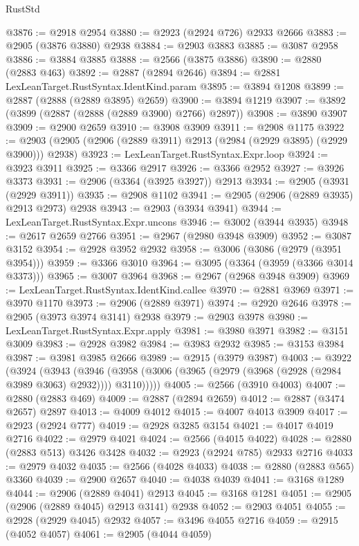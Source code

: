 \begin{lexlean}{RustStd}
\begin{coremodule}
{\begin{coremodule}
{{{{{{{{{{{{{{{{{{{{{{{{{{{{{{{{{{{{{{{{{{{{{{{{{{{{{{{{{{{{{{{{{{{{{{{{{{{{{{@3876 := @2918 @2954
@3880 := @2923 (@2924 @726) @2933 @2666
@3883 := @2905 (@3876 @3880) @2938
@3884 := @2903 @3883
@3885 := @3087 @2958
@3886 := @3884 @3885
@3888 := @2566 (@3875 @3886)
@3890 := @2880 (@2883 @463)
@3892 := @2887 (@2894 @2646)
@3894 := @2881 LexLeanTarget.RustSyntax.IdentKind.param
@3895 := @3894 @1208
@3899 := @2887 (@2888 (@2889 @3895) @2659)
@3900 := @3894 @1219
@3907 := @3892 (@3899 (@2887 (@2888 (@2889 @3900) @2766) @2897))
@3908 := @3890 @3907
@3909 := @2900 @2659
@3910 := @3908 @3909
@3911 := @2908 @1175
@3922 := @2903 (@2905 (@2906 (@2889 @3911) @2913 (@2984 (@2929 @3895) (@2929 @3900))) @2938)
@3923 := LexLeanTarget.RustSyntax.Expr.loop
@3924 := @3923 @3911
@3925 := @3366 @2917
@3926 := @3366 @2952
@3927 := @3926 @3373
@3931 := @2906 (@3364 (@3925 @3927)) @2913
@3934 := @2905 (@3931 (@2929 @3911))
@3935 := @2908 @1102
@3941 := @2905 (@2906 (@2889 @3935) @2913 @2973) @2938
@3943 := @2903 (@3934 @3941)
@3944 := LexLeanTarget.RustSyntax.Expr.uncons
@3946 := @3002 (@3944 @3935)
@3948 := @2617 @2659 @2766
@3951 := @2967 (@2980 @3948 @3909)
@3952 := @3087 @3152
@3954 := @2928 @3952 @2932
@3958 := @3006 (@3086 (@2979 (@3951 @3954)))
@3959 := @3366 @3010
@3964 := @3095 (@3364 (@3959 (@3366 @3014 @3373)))
@3965 := @3007 @3964
@3968 := @2967 (@2968 @3948 @3909)
@3969 := LexLeanTarget.RustSyntax.IdentKind.callee
@3970 := @2881 @3969
@3971 := @3970 @1170
@3973 := @2906 (@2889 @3971)
@3974 := @2920 @2646
@3978 := @2905 (@3973 @3974 @3141) @2938
@3979 := @2903 @3978
@3980 := LexLeanTarget.RustSyntax.Expr.apply
@3981 := @3980 @3971
@3982 := @3151 @3009
@3983 := @2928 @3982
@3984 := @3983 @2932
@3985 := @3153 @3984
@3987 := @3981 @3985 @2666
@3989 := @2915 (@3979 @3987)
@4003 := @3922
    (@3924
      (@3943
        (@3946 (@3958 (@3006 (@3965 (@2979 (@3968 (@2928 (@2984 @3989 @3063) @2932)))) @3110)))))
@4005 := @2566 (@3910 @4003)
@4007 := @2880 (@2883 @469)
@4009 := @2887 (@2894 @2659)
@4012 := @2887 (@3474 @2657) @2897
@4013 := @4009 @4012
@4015 := @4007 @4013 @3909
@4017 := @2923 (@2924 @777)
@4019 := @2928 @3285 @3154
@4021 := @4017 @4019 @2716
@4022 := @2979 @4021
@4024 := @2566 (@4015 @4022)
@4028 := @2880 (@2883 @513) @3426 @3428
@4032 := @2923 (@2924 @785) @2933 @2716
@4033 := @2979 @4032
@4035 := @2566 (@4028 @4033)
@4038 := @2880 (@2883 @565) @3360
@4039 := @2900 @2657
@4040 := @4038 @4039
@4041 := @3168 @1289
@4044 := @2906 (@2889 @4041) @2913
@4045 := @3168 @1281
@4051 := @2905 (@2906 (@2889 @4045) @2913 @3141) @2938
@4052 := @2903 @4051
@4055 := @2928 (@2929 @4045) @2932
@4057 := @3496 @4055 @2716
@4059 := @2915 (@4052 @4057)
@4061 := @2905 (@4044 @4059)
}}}}}}}}}}}}}}}}}}}}}}}}}}}}}}}}}}}}}}}}}}}}}}}}}}}}}}}}}}}}}}}}}}}}}}}}}}}}}}
\end{coremodule}}
\end{coremodule}
\end{lexlean}
